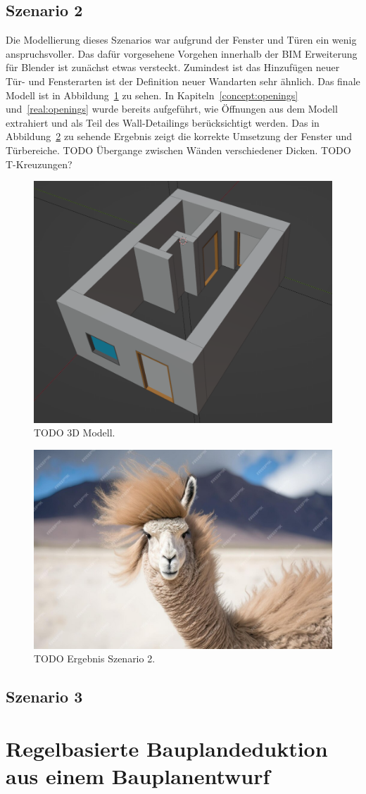 \subsection{Szenario 2}\label{poc:scenario2}
Die Modellierung dieses Szenarios war aufgrund der Fenster und Türen ein wenig anspruchsvoller.
Das dafür vorgesehene Vorgehen innerhalb der BIM Erweiterung für Blender ist zunächst etwas versteckt.
Zumindest ist das Hinzufügen neuer Tür- und Fensterarten ist der Definition neuer Wandarten sehr ähnlich.
Das finale Modell ist in Abbildung~\ref{fig:poc:scenario2 modell} zu sehen.
In Kapiteln~\ref{concept:openings} und~\ref{real:openings} wurde bereits aufgeführt, wie Öffnungen aus dem Modell extrahiert und als Teil des Wall-Detailings berücksichtigt werden.
Das in Abbildung~\ref{fig:poc:scenario2 ergebnis} zu sehende Ergebnis zeigt die korrekte Umsetzung der Fenster und Türbereiche.
TODO Übergange zwischen Wänden verschiedener Dicken.
TODO T-Kreuzungen?

\begin{figure}[hb]
  \centering
  \includegraphics[width=0.5\columnwidth]{fig/scenario1_screenshot.png}
  \caption{TODO 3D Modell.}\label{fig:poc:scenario2 modell}
\end{figure}

\begin{figure}[ht!]
  \centering
  \includegraphics[width=0.6\columnwidth]{fig/TODO.jpg}
  \caption{TODO Ergebnis Szenario 2.}\label{fig:poc:scenario2 ergebnis}
\end{figure}

\subsection{Szenario 3}\label{poc:scenario3}
\section{Regelbasierte Bauplandeduktion aus einem Bauplanentwurf}